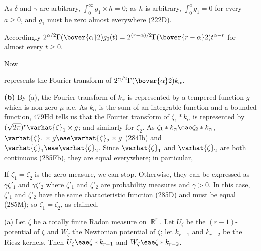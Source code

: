 {

\noindent As $\delta$ and $\gamma$ are arbitrary,
$\int_0^{\infty}g_1\times h=0$;  as $h$ is arbitrary, $\int_0^ag_1=0$
for every $a\ge 0$, and $g_1$ must be zero almost
everywhere (222D).\ \Qed

Accordingly
$2^{\alpha/2}\Gamma(\bover{\alpha}2)g_0(t)
  =2^{(r-\alpha)/2}\Gamma(\bover{r-\alpha}2)t^{\alpha-r}$
for almost every $t\ge 0$.

\medskip

 Now


\noindent represents the Fourier transform of
$2^{\alpha/2}\Gamma(\bover{\alpha}2)k_{\alpha}$.

\medskip

{\bf (b)} By (a), the Fourier transform of $k_{\alpha}$ is represented by a
tempered function $g$ which is non-zero $\mu$-a.e.
As $k_{\alpha}$ is the sum of an integrable function and a bounded
function, 479Hd tells us that the Fourier
transform of $\zeta_1*k_{\alpha}$ is represented by
$(\sqrt{2\pi})^r\varhat{\zeta}_1\times g$;  and similarly for $\zeta_2$.
As $\zeta_1*k_{\alpha}\eae\zeta_2*k_{\alpha}$,
$\varhat{\zeta}_1\times g\eae\varhat{\zeta}_2\times g$ (284Ib) and
$\varhat{\zeta}_1\eae\varhat{\zeta}_2$.   Since $\varhat{\zeta}_1$ and
$\varhat{\zeta}_2$ are both continuous (285Fb), they are equal everywhere;
in particular,


\noindent If $\zeta_1=\zeta_2$ is the zero measure, we can stop.
Otherwise, they can be expressed as $\gamma\zeta'_1$ and $\gamma\zeta'_2$
where $\zeta'_1$ and $\zeta'_2$ are probability measures and $\gamma>0$.
In this case, $\zeta'_1$ and $\zeta'_2$ have the same characteristic
function (285D) and must be equal (285M);  so $\zeta_1=\zeta_2$, as
claimed.
}%


 (a) Let $\zeta$ be a totally finite Radon measure on
$\BbbR^r$.   Let $U_{\zeta}$ be the $(r-1)$-potential of $\zeta$ and
$W_{\zeta}$ the Newtonian potential of $\zeta$;  let
$k_{r-1}$ and $k_{r-2}$ be the Riesz kernels.
Then $U_{\zeta}\eae\zeta*k_{r-1}$ and $W_{\zeta}\eae\zeta*k_{r-2}$.


